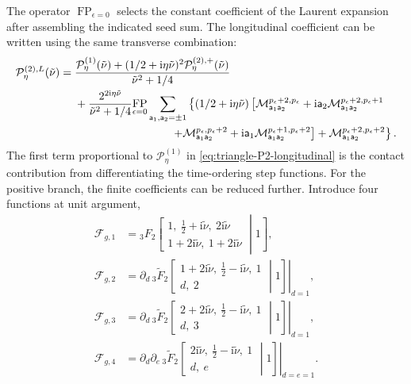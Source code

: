 \documentclass[a4paper,12pt]{article}
\def\ii{\mathrm{i}}
\def\aa{\mathsf{a}}
\begin{document}
The operator $\operatorname{FP}_{\epsilon=0}$ selects the constant coefficient of the Laurent expansion after assembling the indicated seed sum.
The longitudinal coefficient can be written using the same transverse combination:
\begin{align}
    \mathcal P^{(2),L}_{\eta}(\tilde\nu)
    ={}&\frac{\mathcal P^{(1)}_{\eta}(\tilde\nu)
    +(1/2+\ii\eta\tilde\nu)^2
    \mathcal P^{(2),+}_{\eta}(\tilde\nu)}{\tilde\nu^2+1/4}
    \nonumber\\
    &+\frac{2^{2\ii\eta\tilde\nu}}{\tilde\nu^2+1/4}
    \underset{\epsilon=0}{\operatorname{FP}}
    \sum_{\aa_1,\aa_2=\pm1}
    \left\{(1/2+\ii\eta\tilde\nu)
    \left[
    \mathcal M_{\aa_1\aa_2}^{p_\epsilon+2,p_\epsilon}
    +\ii\aa_2\mathcal M_{\aa_1\aa_2}^{p_\epsilon+2,p_\epsilon+1}
    \right.\right.\nonumber\\
    &\hspace{30mm}\left.\left.
    +\mathcal M_{\aa_1\aa_2}^{p_\epsilon,p_\epsilon+2}
    +\ii\aa_1\mathcal M_{\aa_1\aa_2}^{p_\epsilon+1,p_\epsilon+2}
    \right]
    +\mathcal M_{\aa_1\aa_2}^{p_\epsilon+2,p_\epsilon+2}
    \right\}.
    \label{eq:triangle-P2-longitudinal}
\end{align}
The first term proportional to $\mathcal P^{(1)}_{\eta}$ in \eqref{eq:triangle-P2-longitudinal} is the contact contribution from differentiating the time-ordering step functions.
For the positive branch, the finite coefficients can be reduced further.
Introduce four functions at unit argument,
\begin{align}
 \mathcal F_{g,1}&={}_3F_2\!\left[
 \begin{matrix}1,\ \tfrac12+\ii\tilde\nu,\ 2\ii\tilde\nu\\
 1+2\ii\tilde\nu,\ 1+2\ii\tilde\nu\end{matrix}\middle|1\right],\nonumber\\
 \mathcal F_{g,2}&=\left.\partial_d\,
 {}_3\widetilde F_2\!\left[
 \begin{matrix}1+2\ii\tilde\nu,\ \tfrac12-\ii\tilde\nu,\ 1\\
 d,\ 2\end{matrix}\middle|1\right]\right|_{d=1},\nonumber\\
 \mathcal F_{g,3}&=\left.\partial_d\,
 {}_3\widetilde F_2\!\left[
 \begin{matrix}2+2\ii\tilde\nu,\ \tfrac12-\ii\tilde\nu,\ 1\\
 d,\ 3\end{matrix}\middle|1\right]\right|_{d=1},\nonumber\\
 \mathcal F_{g,4}&=\left.\partial_d\partial_e\,
 {}_3\widetilde F_2\!\left[
 \begin{matrix}2\ii\tilde\nu,\ \tfrac12-\ii\tilde\nu,\ 1\\
 d,\ e\end{matrix}\middle|1\right]\right|_{d=e=1}.
 \label{eq:gauge-finite-masters}
\end{align}
\end{document}
